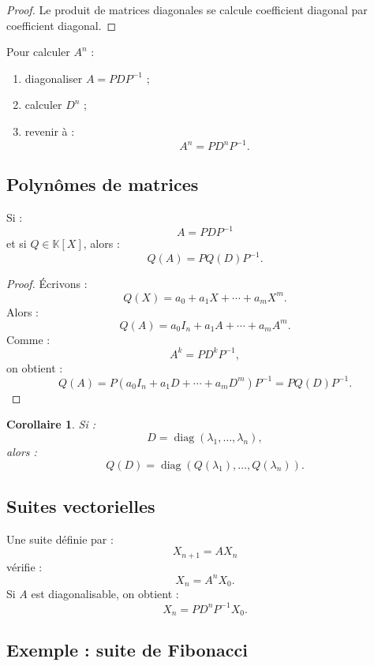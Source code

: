 \documentclass[11pt,a4paper]{article}
\newcommand{\K}{\mathbb K}
\newcommand{\diag}{\operatorname{diag}}
\newtheorem{corollaire}[prop]{Corollaire}
\begin{document}
\begin{proof}
Le produit de matrices diagonales se calcule coefficient diagonal par coefficient diagonal.
\end{proof}

\begin{methodbox}[Calculer \(A^n\)]
Pour calculer \(A^n\) :
\begin{enumerate}
    \item diagonaliser \(A=PDP^{-1}\) ;
    \item calculer \(D^n\) ;
    \item revenir à :
    \[
    A^n=PD^nP^{-1}.
    \]
\end{enumerate}
\end{methodbox}

\subsection{Polynômes de matrices}

\begin{theorembox}
Si :
\[
A=PDP^{-1}
\]
et si \(Q\in\K[X]\), alors :
\[
Q(A)=PQ(D)P^{-1}.
\]
\end{theorembox}

\begin{proof}
Écrivons :
\[
Q(X)=a_0+a_1X+\cdots+a_mX^m.
\]
Alors :
\[
Q(A)=a_0I_n+a_1A+\cdots+a_mA^m.
\]
Comme :
\[
A^k=PD^kP^{-1},
\]
on obtient :
\[
Q(A)
=
P(a_0I_n+a_1D+\cdots+a_mD^m)P^{-1}
=
PQ(D)P^{-1}.
\]
\end{proof}

\begin{corollaire}
Si :
\[
D=\diag(\lambda_1,\dots,\lambda_n),
\]
alors :
\[
Q(D)=\diag(Q(\lambda_1),\dots,Q(\lambda_n)).
\]
\end{corollaire}

\subsection{Suites vectorielles}

Une suite définie par :
\[
X_{n+1}=AX_n
\]
vérifie :
\[
X_n=A^nX_0.
\]
Si \(A\) est diagonalisable, on obtient :
\[
X_n=PD^nP^{-1}X_0.
\]

\subsection{Exemple : suite de Fibonacci}
\end{document}
